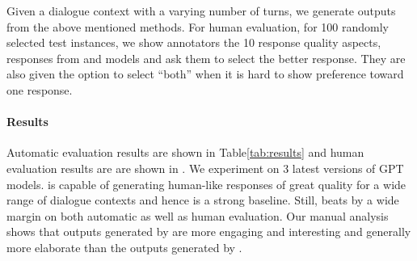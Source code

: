 Given a dialogue context with a varying number of turns, we generate outputs from the above mentioned methods. For human evaluation, for 100 randomly selected test instances, we show annotators the 10 response quality aspects, responses from \ours and \init models and ask them to select the better response. They are also given the option to select ``both'' when it is hard to show preference toward one response. 


\paragraph{Results}
Automatic evaluation results are shown in Table\ref{tab:results} and human evaluation results are are shown in . We experiment on 3 latest versions of GPT models.
\gptlatest is capable of generating human-like responses of great quality for a wide range of dialogue contexts and hence \direct is a strong baseline. Still, \ours beats \init by a wide margin on both automatic as well as human evaluation. 
Our manual analysis shows that outputs generated by \ours are more engaging and interesting and generally more elaborate than the outputs generated by \init.


